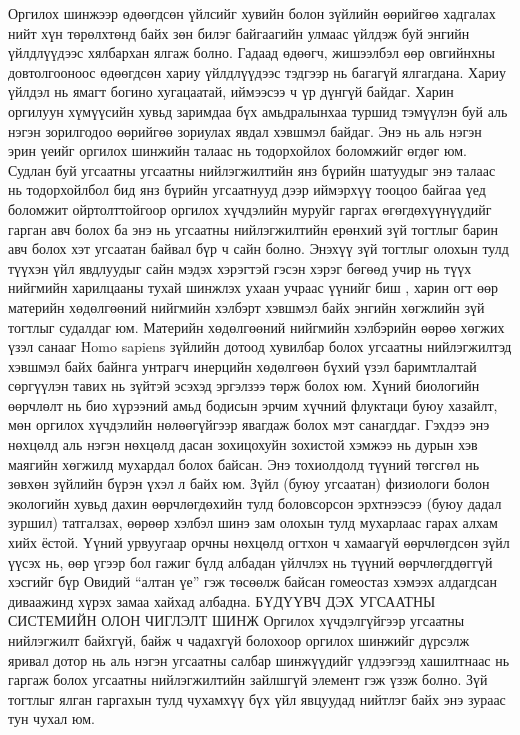 Оргилох шинжээр өдөөгдсөн үйлсийг хувийн болон зүйлийн өөрийгөө хадгалах нийт хүн төрөлхтөнд байх зөн билэг байгаагийн улмаас үйлдэж буй энгийн үйлдлүүдээс хялбархан ялгаж болно. Гадаад өдөөгч, жишээлбэл өөр овгийнхны довтолгооноос өдөөгдсөн хариу үйлдлүүдээс тэдгээр нь багагүй ялгагдана. Хариу үйлдэл нь ямагт богино хугацаатай, иймээсээ ч үр дүнгүй байдаг. Харин оргилуун хүмүүсийн хувьд заримдаа бүх амьдралынхаа туршид тэмүүлэн буй аль нэгэн зорилгодоо өөрийгөө зориулах явдал хэвшмэл байдаг. Энэ нь аль нэгэн эрин үеийг оргилох шинжийн талаас нь тодорхойлох боломжийг өгдөг юм. Судлан буй угсаатны угсаатны нийлэгжилтийн янз бүрийн шатуудыг энэ талаас нь тодорхойлбол бид янз бүрийн угсаатнууд дээр иймэрхүү тооцоо байгаа үед боломжит ойртолттойгоор оргилох хүчдэлийн муруйг гаргах өгөгдөхүүнүүдийг гарган авч болох ба энэ нь угсаатны нийлэгжилтийн ерөнхий зүй тогтлыг барин авч болох хэт угсаатан байвал бүр ч сайн болно. Энэхүү зүй тогтлыг олохын тулд түүхэн үйл явдлуудыг сайн мэдэх хэрэгтэй гэсэн хэрэг бөгөөд учир нь түүх нийгмийн харилцааны тухай шинжлэх ухаан учраас үүнийг биш , харин огт өөр материйн хөдөлгөөний нийгмийн хэлбэрт хэвшмэл байх энгийн хөгжлийн зүй тогтлыг судалдаг юм.
Материйн хөдөлгөөний нийгмийн хэлбэрийн өөрөө хөгжих үзэл санааг Homo sapiens зүйлийн дотоод хувилбар болох угсаатны нийлэгжилтэд хэвшмэл байх байнга унтрагч инерцийн хөдөлгөөн бүхий үзэл баримтлалтай сөргүүлэн тавих нь зүйтэй эсэхэд эргэлзээ төрж болох юм. Хүний биологийн өөрчлөлт нь био хүрээний амьд бодисын эрчим хүчний флуктаци буюу хазайлт, мөн оргилох хүчдэлийн нөлөөгүйгээр явагдаж болох мэт санагддаг. Гэхдээ энэ нөхцөлд аль нэгэн нөхцөлд дасан зохицохуйн зохистой хэмжээ нь дурын хэв маягийн хөгжилд мухардал болох байсан. Энэ тохиолдолд түүний төгсгөл нь зөвхөн зүйлийн бүрэн үхэл л байх юм. Зүйл (буюу угсаатан) физиологи болон экологийн хувьд дахин өөрчлөгдөхийн тулд боловсорсон эрхтнээсээ (буюу дадал зуршил) татгалзах, өөрөөр хэлбэл шинэ зам олохын тулд мухарлаас гарах алхам хийх ёстой. Үүний урвуугаар орчны нөхцөлд огтхон ч хамаагүй өөрчлөгдсөн зүйл үүсэх нь, өөр үгээр бол гажиг бүлд албадан үйлчлэх нь түүний өөрчлөгддөггүй хэсгийг бүр Овидий “алтан үе” гэж төсөөлж байсан гомеостаз хэмээх алдагдсан диваажинд хүрэх замаа хайхад албадна.
БҮДҮҮВЧ ДЭХ УГСААТНЫ СИСТЕМИЙН ОЛОН ЧИГЛЭЛТ ШИНЖ
Оргилох хүчдэлгүйгээр угсаатны нийлэгжилт байхгүй, байж ч чадахгүй болохоор оргилох шинжийг дүрсэлж яривал дотор нь аль нэгэн угсаатны салбар шинжүүдийг үлдээгээд хашилтнаас нь гаргаж болох угсаатны нийлэгжилтийн зайлшгүй элемент гэж үзэж болно. Зүй тогтлыг ялган гаргахын тулд чухамхүү бүх үйл явцуудад нийтлэг байх энэ зураас тун чухал юм.
